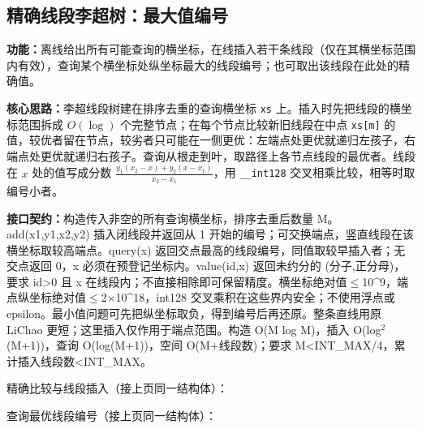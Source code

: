 \subsection{精确线段李超树：最大值编号}\label{compact-SegmentLiChao}

\noindent\textbf{功能：}\allowbreak 离线给出所有可能查询的横坐标，在线插入若干条线段（仅在其横坐标范围内有效），查询某个横坐标处纵坐标最大的线段编号；也可取出该线段在此处的精确值。

\textbf{核心思路：}\allowbreak 李超线段树建在排序去重的查询横坐标 \texttt{xs} 上。插入时先把线段的横坐标范围拆成 $O(\log)$ 个完整节点；在每个节点比较新旧线段在中点 \texttt{xs[m]} 的值，较优者留在节点，较劣者只可能在一侧更优：左端点处更优就递归左孩子，右端点处更优就递归右孩子。查询从根走到叶，取路径上各节点线段的最优者。线段在 $x$ 处的值写成分数 $\frac{y_1(x_2-x)+y_2(x-x_1)}{x_2-x_1}$，用 \texttt{\_\_int128} 交叉相乘比较，相等时取编号小者。



{\sloppy{}\noindent\textbf{接口契约：}构造传入非空的所有查询横坐标，排序去重后数量 M。add(x1,y1,x2,y2) 插入闭线段并返回从 1 开始的编号；可交换端点，竖直线段在该横坐标取较高端点。query(x) 返回交点最高的线段编号，同值取较早插入者；无交点返回 0，x 必须在预登记坐标内。value(id,x) 返回未约分的 (分子,正分母)，要求 id>0 且 x 在线段内；不直接相除即可保留精度。横坐标绝对值$\le$10\textasciicircum{}9，端点纵坐标绝对值$\le$2×10\textasciicircum{}18，int128 交叉乘积在这些界内安全；不使用浮点或 epsilon。最小值问题可先把纵坐标取负，得到编号后再还原。整条直线用原 LiChao 更短；这里插入仅作用于端点范围。构造 O(M log M)，插入 O(log$^{2}$(M+1))，查询 O(log(M+1))，空间 O(M+线段数)；要求 M<INT\_MAX/4，累计插入线段数<INT\_MAX。\par}

\Needspace{413pt}



\newpage

\noindent 精确比较与线段插入（接上页同一结构体）：



\newpage

\noindent 查询最优线段编号（接上页同一结构体）：



\Needspace{499pt}

